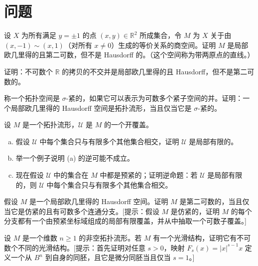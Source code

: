 \documentclass[../../main.tex]{subfiles}
\begin{document}
\section*{问题}\label{section:ch01-问题}

\begin{exercise}\label{exercise:ch01-1-1}
设 $X$ 为所有满足 $y=\pm 1$ 的点 $(x,y)\in\mathbb{R}^{2}$ 所成集合，令 $M$ 为 $X$ 关于由 $(x,-1)\sim(x,1)$（对所有 $x\neq 0$）生成的等价关系的商空间。证明 $M$ 是局部欧几里得的且第二可数，但不是 Hausdorff 的。（这个空间称为带两原点的直线。）
\end{exercise}

\begin{exercise}\label{exercise:ch01-1-2}
证明：不可数个 $\mathbb{R}$ 的拷贝的不交并是局部欧几里得的且 Hausdorff，但不是第二可数的。
\end{exercise}

\begin{exercise}\label{exercise:ch01-1-3}
称一个拓扑空间是 $\sigma$-紧的，如果它可以表示为可数多个紧子空间的并。证明：一个局部欧几里得的 Hausdorff 空间是拓扑流形，当且仅当它是 $\sigma$-紧的。
\end{exercise}

\begin{exercise}\label{exercise:ch01-1-4}
设 $M$ 是一个拓扑流形，$\mathcal{U}$ 是 $M$ 的一个开覆盖。
\begin{enumerate}[(a)]
\item 假设 $\mathcal{U}$ 中每个集合只与有限多个其他集合相交，证明 $\mathcal{U}$ 是局部有限的。
\item 举一个例子说明 (a) 的逆可能不成立。
\item 现在假设 $\mathcal{U}$ 中的集合在 $M$ 中都是预紧的；证明逆命题：若 $\mathcal{U}$ 是局部有限的，则 $\mathcal{U}$ 中每个集合只与有限多个其他集合相交。
\end{enumerate}
\end{exercise}

\begin{exercise}\label{exercise:ch01-1-5}
假设 $M$ 是一个局部欧几里得的 Hausdorff 空间。证明 $M$ 是第二可数的，当且仅当它是仿紧的且有可数多个连通分支。[提示：假设 $M$ 是仿紧的，证明 $M$ 的每个分支都有一个由预紧坐标域组成的局部有限覆盖，并从中抽取一个可数子覆盖。]
\end{exercise}

\begin{exercise}\label{exercise:ch01-1-6}
设 $M$ 是一个维数 $n\geqslant 1$ 的非空拓扑流形。若 $M$ 有一个光滑结构，证明它有不可数个不同的光滑结构。[提示：首先证明对任意 $s>0$，映射 $F_{s}(x)=|x|^{s-1}x$ 定义一个从 $B^{n}$ 到自身的同胚，且它是微分同胚当且仅当 $s=1$。]
\end{exercise}
\end{document}
